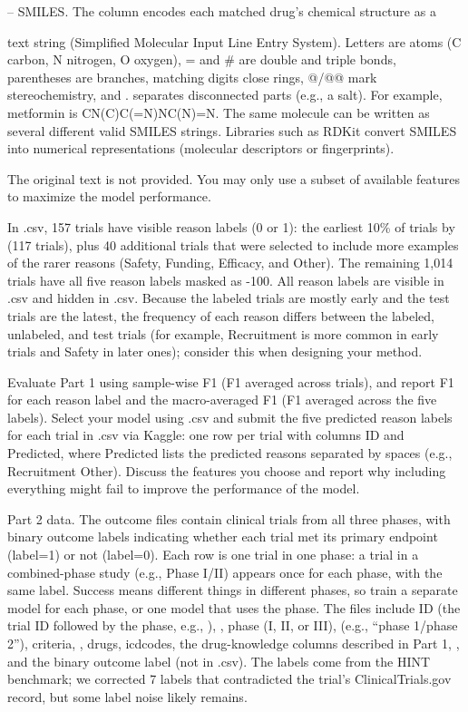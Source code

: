 \documentclass[11pt,letterpaper]{article}
\begin{document}
-- SMILES. The  column encodes each matched drug's chemical structure as a

text string (Simplified Molecular Input Line Entry System). Letters are atoms (C carbon, N nitrogen,
O oxygen), = and \# are double and triple bonds, parentheses are branches, matching digits close
rings, @/@@ mark stereochemistry, and . separates disconnected parts (e.g., a salt). For example,
metformin is CN(C)C(=N)NC(N)=N. The same molecule can be written as several different valid SMILES
strings. Libraries such as RDKit convert SMILES into numerical representations (molecular
descriptors or fingerprints).

The original  text is not provided. You may only use a subset of available features
to maximize the model performance.

In .csv, 157 trials have visible reason labels (0 or 1): the earliest 10\% of
trials by  (117 trials), plus 40 additional trials that were selected to include
more examples of the rarer reasons (Safety, Funding, Efficacy, and Other). The remaining 1,014
trials have all five reason labels masked as -100. All reason labels are visible in
.csv and hidden in .csv. Because the labeled trials are mostly
early and the test trials are the latest, the frequency of each reason differs between the labeled,
unlabeled, and test trials (for example, Recruitment is more common in early trials and Safety in
later ones); consider this when designing your method.

Evaluate Part 1 using sample-wise F1 (F1 averaged across trials), and report F1 for each reason
label and the macro-averaged F1 (F1 averaged across the five labels). Select your model using
.csv and submit the five predicted reason labels for each trial in
.csv via Kaggle: one row per trial with columns ID and Predicted, where Predicted
lists the predicted reasons separated by spaces (e.g., Recruitment Other). Discuss the features you
choose and report why including everything might fail to improve the performance of the model.

Part 2 data. The outcome files contain clinical trials from all three phases, with binary outcome
labels indicating whether each trial met its primary endpoint (label=1) or not (label=0). Each row
is one trial in one phase: a trial in a combined-phase study (e.g., Phase I/II) appears once for
each phase, with the same label. Success means different things in different phases, so train a
separate model for each phase, or one model that uses the phase. The files include ID (the trial ID
followed by the phase, e.g., ), , phase (I, II, or III),
 (e.g., ``phase 1/phase 2''), criteria, , drugs, icdcodes,
the drug-knowledge columns described in Part 1, , and the binary outcome label (not
in .csv). The labels come from the HINT benchmark; we corrected 7 labels that
contradicted the trial's ClinicalTrials.gov record, but some label noise likely remains.
\end{document}
